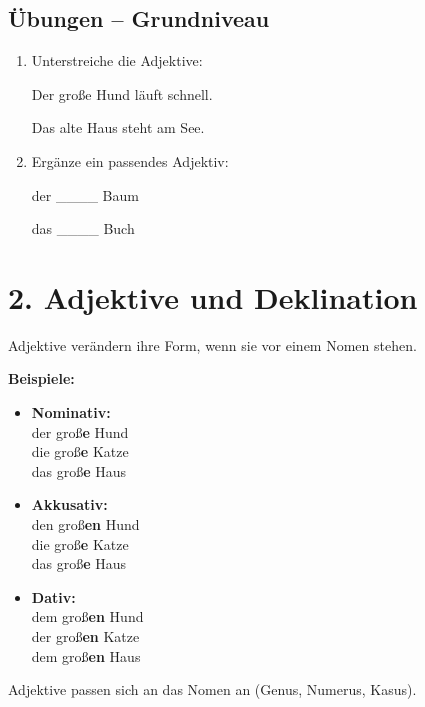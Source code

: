 \documentclass[a4paper,12pt]{article}
\begin{document}
\subsection*{Übungen – Grundniveau}

\begin{enumerate}
\item Unterstreiche die Adjektive:

Der große Hund läuft schnell.

Das alte Haus steht am See.

\item Ergänze ein passendes Adjektiv:

der \_\_\_\_ Baum

das \_\_\_\_ Buch
\end{enumerate}

\section*{2. Adjektive und Deklination}

Adjektive verändern ihre Form, wenn sie vor einem Nomen stehen.

\textbf{Beispiele:}

\begin{itemize}
\item \textbf{Nominativ:}\\
der groß\textbf{e} Hund\\
die groß\textbf{e} Katze\\
das groß\textbf{e} Haus

\item \textbf{Akkusativ:}\\
den groß\textbf{en} Hund\\
die groß\textbf{e} Katze\\
das groß\textbf{e} Haus

\item \textbf{Dativ:}\\
dem groß\textbf{en} Hund\\
der groß\textbf{en} Katze\\
dem groß\textbf{en} Haus
\end{itemize}

\begin{merksatz}
Adjektive passen sich an das Nomen an (Genus, Numerus, Kasus).
\end{merksatz}
\newpage

\end{document}
